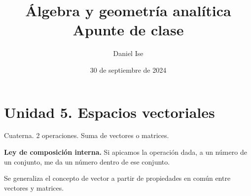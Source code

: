 \documentclass[12pt]{article}
\title{Álgebra y geometría analítica\\Apunte de clase}
\author{Daniel Ise}
\date{30 de septiembre de 2024}
\begin{document}
\maketitle

\tableofcontents

\pagebreak

\section{Unidad 5. Espacios vectoriales}

Cuaterna. 2 operaciones.
Suma de vectores o matrices. 

\textbf{Ley de composición interna.}
Si apicamos la operación dada,
a un número de un conjunto,
me da un número dentro de ese conjunto.

Se generaliza el concepto de vector a partir de propiedades en común
entre vectores y matrices.
\end{document}
